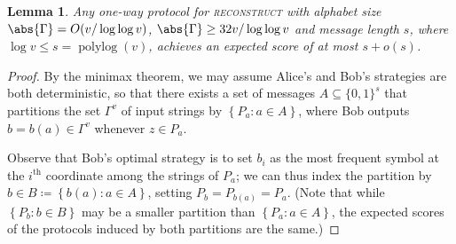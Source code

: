 \documentclass[a4paper,UKenglish,cleveref, autoref, thm-restate]{lipics-v2021}
\newtheorem{lemma}[theorem]{Lemma}
\theoremstyle{definition}
\renewcommand{\set}[1]{\left\{#1\right\}}
\newcommand{\polylog}{\operatorname{polylog}}
\newcommand{\bitset}{\{0,1\}}
\newcommand{\reconstruct}{\normalfont\textsc{reconstruct}\xspace}
\newcommand{\vcommitlength}{v}
\newcommand{\vcommitstring}{z}
\newcommand{\alphabet}{\Gamma}
\begin{document}
\begin{lemma}
    \label{lem:reconstruct-bound}
    Any one-way protocol for \reconstruct with alphabet size $\abs{\alphabet} = O(\vcommitlength / \log\log \vcommitlength)$, $\abs{\alphabet} \geq 32\vcommitlength / \log\log \vcommitlength$ and message length $s$, where $\log \vcommitlength \leq s = \polylog(\vcommitlength)$, achieves an expected score of at most $s + o(s)$.
\end{lemma}
\begin{proof}
    By the minimax theorem, we may assume Alice's and Bob's strategies are both deterministic, so that there exists a set of messages $A \subseteq \bitset^s$ that partitions the set $\alphabet^\vcommitlength$ of input strings by $\set{P_a : a \in A}$, where Bob outputs $b = b(a) \in \alphabet^\vcommitlength$ whenever $\vcommitstring \in P_a$.
    
    Observe that Bob's optimal strategy is to set $b_i$ as the most frequent symbol at the $i^\text{th}$  coordinate among the strings of $P_a$; we can thus index the partition by $b \in B \coloneqq \set{b(a) : a \in A}$, setting $P_b = P_{b(a)} = P_a$. (Note that while $\set{P_b : b \in B}$ may be a smaller partition than $\set{P_a : a \in A}$, the expected scores of the protocols induced by both partitions are the same.)
    

\end{proof}
\end{document}

